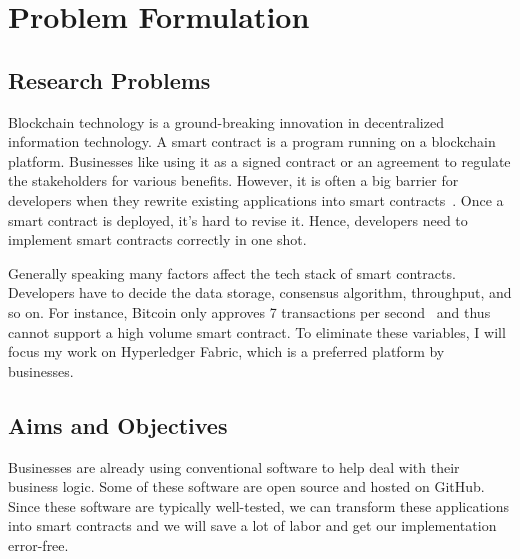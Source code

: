 \chapter{Problem Formulation}

\section{Research Problems}

Blockchain technology is a ground-breaking innovation in decentralized information technology.
A smart contract is a program running on a blockchain platform.
Businesses like using it as a signed contract or an agreement to regulate the stakeholders for various benefits.
However, it is often a big barrier for developers when they rewrite existing applications into smart contracts~\cite{dao2019challenges}.
Once a smart contract is deployed, it's hard to revise it.
Hence, developers need to implement smart contracts correctly in one shot.

Generally speaking many factors affect the tech stack of smart contracts.
Developers have to decide the data storage, consensus algorithm, throughput, and so on.
For instance, Bitcoin only approves 7 transactions per second~\cite{croman2016scaling} and thus cannot support a high volume smart contract.
To eliminate these variables, I will focus my work on Hyperledger Fabric, which is a preferred platform by businesses.








\section{Aims and Objectives}

Businesses are already using conventional software to help deal with their business logic.
Some of these software are open source and hosted on GitHub.
Since these software are typically well-tested, we can transform these applications into smart contracts and we will save a lot of labor and get our implementation error-free.


